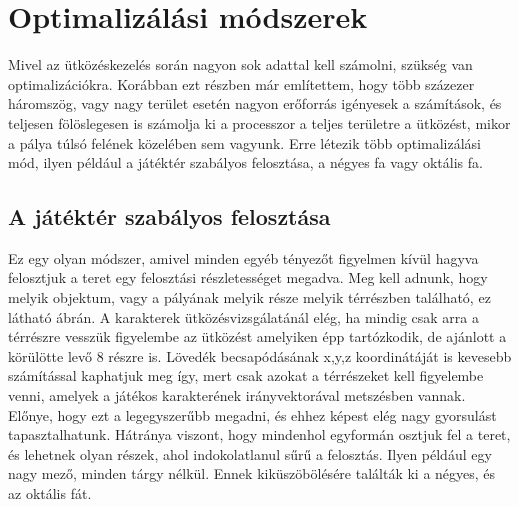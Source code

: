 \section{Optimalizálási módszerek}

Mivel az ütközéskezelés során nagyon sok adattal kell számolni, szükség van optimalizációkra. Korábban ezt részben már említettem, hogy több százezer háromszög, vagy nagy terület esetén nagyon erőforrás igényesek a számítások, és teljesen fölöslegesen is számolja ki a processzor a teljes területre a ütközést, mikor a pálya túlsó felének közelében sem vagyunk. Erre létezik több optimalizálási mód, ilyen például a játéktér szabályos felosztása, a négyes fa vagy oktális fa.

\subsection{A játéktér szabályos felosztása}

Ez egy olyan módszer, amivel minden egyéb tényezőt figyelmen kívül hagyva felosztjuk a teret egy felosztási részletességet megadva. Meg kell adnunk, hogy melyik objektum, vagy a pályának melyik része melyik térrészben található, ez látható  ábrán. A karakterek ütközésvizsgálatánál elég, ha mindig csak arra a térrészre vesszük figyelembe az ütközést amelyiken épp tartózkodik, de ajánlott a körülötte levő 8 részre is. Lövedék becsapódásának x,y,z koordinátáját is kevesebb számítással kaphatjuk meg így, mert csak azokat a térrészeket kell figyelembe venni, amelyek a játékos karakterének irányvektorával metszésben vannak. Előnye, hogy ezt a legegyszerűbb megadni, és ehhez képest elég nagy gyorsulást tapasztalhatunk. Hátránya viszont, hogy mindenhol egyformán osztjuk fel a teret, és lehetnek olyan részek, ahol indokolatlanul sűrű a felosztás. Ilyen például egy nagy mező, minden tárgy nélkül. Ennek kiküszöbölésére találták ki a négyes, és az oktális fát.

